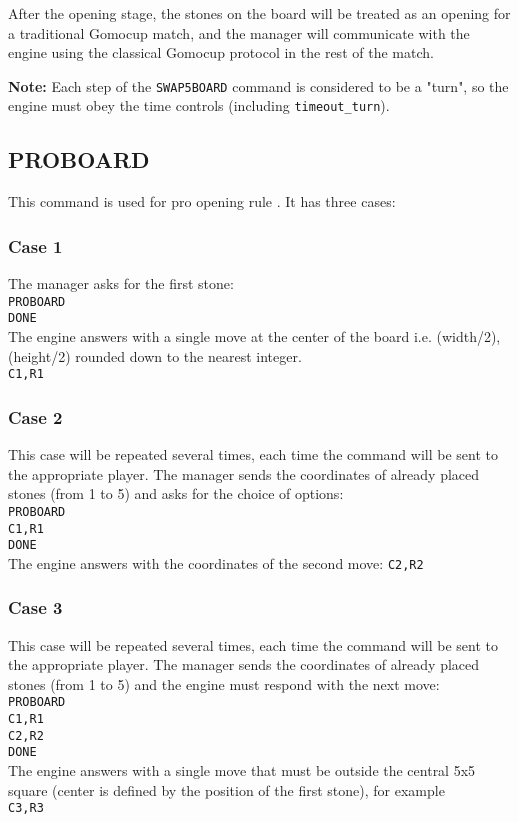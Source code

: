 \documentclass[12pt,a4paper]{article}
\begin{document}
After the opening stage, the stones on the board will be treated as an opening for a traditional Gomocup match, and the manager will communicate with the engine using the classical Gomocup protocol in the rest of the match.

\textbf{Note:} Each step of the \texttt{SWAP5BOARD} command is considered to be a "turn", so the engine must obey the time controls (including \texttt{timeout{\_}turn}).


\subsection{PROBOARD}
\label{cmd_pro}
This command is used for pro opening rule \cite{gomoku_opening_rules}. It has three cases:

\subsubsection{Case 1}
The manager asks for the first stone:\\
\texttt{PROBOARD}\\
\texttt{DONE}\\
The engine answers with a single move at the center of the board i.e. (width/2),(height/2) rounded down to the nearest integer. \\
\texttt{C1,R1}

\subsubsection{Case 2}
This case will be repeated several times, each time the command will be sent to the appropriate player. The manager sends the coordinates of already placed stones (from 1 to 5) and asks for the choice of options:\\
\texttt{PROBOARD}\\
\texttt{C1,R1}\\
\texttt{DONE}\\
The engine answers with the coordinates of the second move:
\texttt{C2,R2}

\subsubsection{Case 3}
This case will be repeated several times, each time the command will be sent to the appropriate player. The manager sends the coordinates of already placed stones (from 1 to 5) and the engine must respond with the next move:\\
\texttt{PROBOARD}\\
\texttt{C1,R1}\\
\texttt{C2,R2}\\
\texttt{DONE}\\
The engine answers with a single move that must be outside the central 5x5 square (center is defined by the position of the first stone), for example\\
\texttt{C3,R3}
\end{document}
